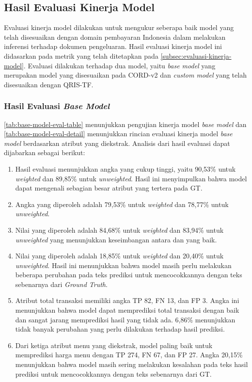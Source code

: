 \subsection{Hasil Evaluasi Kinerja Model}
\label{subsec:hasil-evaluasi-kinerja-model}

Evaluasi kinerja model dilakukan untuk mengukur seberapa baik model \donut{} yang telah disesuaikan dengan domain pembayaran Indonesia dalam melakukan inferensi terhadap dokumen pengeluaran. 
Hasil evaluasi kinerja model ini didasarkan pada metrik yang telah ditetapkan pada \autoref{subsec:evaluasi-kinerja-model}. Evaluasi dilakukan terhadap dua model, yaitu \emph{base model} yang merupakan model \donut{} yang disesuaikan pada \dataset{} CORD-v2 dan \emph{custom model} yang telah disesuaikan dengan \dataset{} QRIS-TF.

\subsubsection{Hasil Evaluasi \emph{Base Model}}
\label{subsubsec:hasil-evaluasi-base-model}
\autoref{tab:base-model-eval-table} menunjukkan pengujian kinerja model \emph{base model} dan \autoref{tab:base-model-eval-detail} menunjukkan rincian evaluasi kinerja model \emph{base model} berdasarkan atribut yang diekstrak. Analisis dari hasil evaluasi dapat dijabarkan sebagai berikut:
\begin{enumerate}
    \item Hasil evaluasi menunjukkan angka \precision{} yang cukup tinggi, yaitu 90,53\% untuk \emph{weighted} dan 89,85\% untuk \emph{unweighted}. Hasil ini menyimpulkan bahwa model dapat mengenali sebagian besar atribut yang tertera pada GT.
    \item Angka \recall{} yang diperoleh adalah 79,53\% untuk \emph{weighted} dan 78,77\% untuk \emph{unweighted}. 
    \item Nilai \fscore{} yang diperoleh adalah 84,68\% untuk \emph{weighted} dan 83,94\% untuk \emph{unweighted} yang menunjukkan keseimbangan antara \precision{} dan \recall{} yang baik.
    \item Nilai \mcer{} yang diperoleh adalah 18,85\% untuk \emph{weighted} dan 20,40\% untuk \emph{unweighted}. Hasil ini menunjukkan bahwa model masih perlu melakukan beberapa perubahan pada teks prediksi untuk mencocokkannya dengan teks sebenarnya dari \emph{Ground Truth}.
    \item Atribut total transaksi memiliki angka TP 82, FN 13, dan FP 3. Angka ini menunjukkan bahwa model dapat memprediksi total transaksi dengan baik dan sangat jarang memprediksi hasil yang tidak ada. \mcer{} 6,86\% menunjukkan tidak banyak perubahan yang perlu dilakukan terhadap hasil prediksi. 
    \item Dari ketiga atribut menu yang diekstrak, model paling baik untuk memprediksi harga menu dengan TP 274, FN 67, dan FP 27. Angka \mcer{} 20,15\% menunjukkan bahwa model masih sering melakukan kesalahan pada teks hasil prediksi untuk mencocokkannya dengan teks sebenarnya dari GT.
\end{enumerate}

